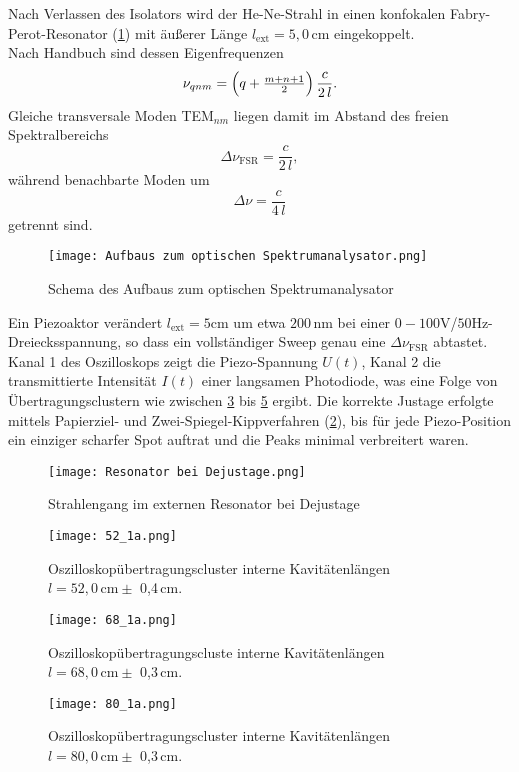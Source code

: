 Nach Verlassen des Isolators wird der He-Ne-Strahl in einen konfokalen Fabry-Perot-Resonator (\cref{fig:Spektrumanalysator}) mit äußerer Länge $l_{\mathrm{ext}} = 5{,}0\,\si{\centi\meter}$ eingekoppelt. \\
Nach Handbuch \cite{praktikum} sind dessen Eigenfrequenzen
\begin{equation}
  \nu_{qnm}
  = \Bigl(q + \tfrac{m+n+1}{2}\Bigr)\,\frac{c}{2\,l} .
\end{equation}
Gleiche transversale Moden TEM$_{nm}$ liegen damit im Abstand des freien Spektralbereichs
\begin{equation*}
  \Delta\nu_{\mathrm{FSR}}
  = \frac{c}{2\,l},
\end{equation*}
während benachbarte Moden um
\begin{equation*}
  \Delta\nu
  = \frac{c}{4\,l}
\end{equation*}
getrennt sind.
\begin{figure}[htbp]
  \centering
  \texttt{[image: Aufbaus zum optischen Spektrumanalysator.png]}
  \caption{Schema des Aufbaus zum optischen Spektrumanalysator \cite{praktikum}}
  \label{fig:Spektrumanalysator}
\end{figure}

Ein Piezoaktor verändert $l_{\mathrm{ext}} = 5 \si{\cm}$ um etwa $200\,\si{\nm}$ bei einer $0-100 \si{\volt}  $/$50 \si{\hertz}$-Dreiecksspannung, so dass ein vollständiger Sweep genau eine $\Delta\nu_{\mathrm{FSR}}$ abtastet. 
Kanal 1 des Oszilloskops zeigt die Piezo-Spannung $U(t)$, Kanal 2 die transmittierte Intensität $I(t)$ einer langsamen Photodiode, was eine Folge von Übertragungsclustern wie zwischen \cref{fig:9a} bis \cref{fig:9c} ergibt. 
Die korrekte Justage erfolgte mittels Papierziel- und Zwei-Spiegel-Kippverfahren (\cref{fig:Resonator}), bis für jede Piezo-Position ein einziger scharfer Spot auftrat und die Peaks minimal verbreitert waren.
\begin{figure}[htbp]
  \centering
  \texttt{[image: Resonator bei Dejustage.png]}
  \caption{Strahlengang im externen Resonator bei Dejustage \cite{praktikum}}
  \label{fig:Resonator}
\end{figure}
\begin{figure}[htbp]
    \centering
    \texttt{[image: 52\_1a.png]}
     \caption{Oszilloskopübertragungscluster interne Kavitätenlängen $l = 52,0\,\si{\centi\meter} \pm$ 0{,}4\,\si{\centi\meter}.}
    \label{fig:9a}
\end{figure}
  \begin{figure}[htbp]
    \centering
    \texttt{[image: 68\_1a.png]}
     \caption{Oszilloskopübertragungscluste interne Kavitätenlängen $l = 68,0\,\si{\centi\meter} \pm$ 0{,}3\,\si{\centi\meter}.}
    \label{fig:9b}
  \end{figure}
  \newpage
  \begin{figure}[htbp]
    \centering
    \texttt{[image: 80\_1a.png]}
     \caption{Oszilloskopübertragungscluster interne Kavitätenlängen $l = 80,0\,\si{\centi\meter} \pm$ 0{,}3\,\si{\centi\meter}.}
    \label{fig:9c}
  \end{figure}
 
